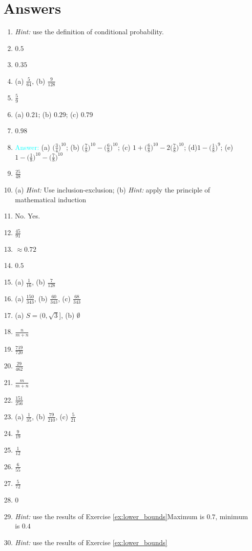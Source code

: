 \documentclass[14pt]{exam}
\begin{document}
 	\section*{Answers}
 	\begin{enumerate}
 		\item \textit{Hint:} use the definition of conditional probability.
 		\item $0.5$
 		\item $0.35$
 		\item (a) $\frac{5}{64}$, (b) $\frac{9}{128}$
 		\item $\frac{5}{9}$
 		\item (a) $0.21$; (b) $0.29$; (c) $0.79$
 		\item $0.98$
 		\item \textcolor{cyan}{Answer:} (a) $\bigr(\frac{3}{4}\bigr)^{10}$; (b) $\bigr(\frac{7}{8}\bigr)^{10} - \bigr(\frac{6}{8}\bigr)^{10}$;
		(c) $1 + \bigr(\frac{6}{8}\bigr)^{10} - 2 \bigr(\frac{7}{8}\bigr)^{10}$; (d)$1 - \bigr(\frac{1}{8}\bigr)^{9}$; (e) $1 -  \bigr(\frac{1}{8}\bigr)^{10} - \bigr(\frac{7}{8}\bigr)^{10}$
		\item $\frac{25}{48}$
		\item (a) \textit{Hint:} Use inclusion-exclusion; (b) \textit{Hint:} apply the principle of mathematical induction
		\item No. Yes.
		\item $\frac{45}{91}$
		\item $\approx0.72$
		\item $0.5$


 		\setcounter{enumi}{15}



		\item (a) $\frac{1}{16}$, (b) $\frac{7}{128}$
		\item (a) $\frac{150}{343}$, (b) $\frac{60}{343}$, (c) $\frac{68}{343}$
		\item (a) $S = (0, \sqrt 3]$, (b) $\emptyset$
		\item $\frac{n}{m+n}$
		\item $\frac{719}{720}$
		\item $\frac{29}{462}$
		\item $\frac{m}{m+n}$
		\item $\frac{151}{256}$
		\item (a) $\frac{1}{35}$, (b) $\frac{79}{210}$, (c) $\frac{5}{21}$
		\item $\frac{9}{19}$
		\item $\frac{1}{12}$
		\item $\frac{6}{55}$
		\item $\frac{5}{72}$
		\item $0$
		\item \textit{Hint:} use the results of Exercise \ref{ex:lower_bounds}Maximum is $0.7$, minimum is $0.4$
 		\item \textit{Hint:} use the results of Exercise \ref{ex:lower_bounds}
 		

\end{enumerate}
\end{document}
